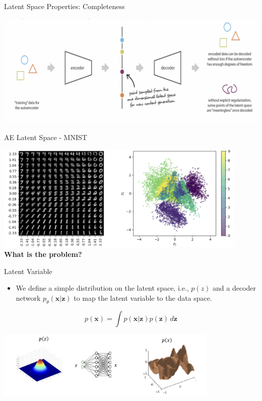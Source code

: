 \documentclass[serif, aspectratio=169]{beamer}
\begin{document}
\begin{frame}{Latent Space Properties: Completeness}
      \begin{center}
        \includegraphics[width=\textwidth]{pic/Latent space property-Completeness.png} 
    \end{center}
\end{frame}

\begin{frame}{AE Latent Space - MNIST}
    \begin{center}
        \includegraphics[width=0.9\textwidth]{pic/AE Latent space - MNIST.png}
        {\color{deepred}\textbf{\\ What is the problem?}}
    \end{center}
\end{frame}

\begin{frame}{Latent Variable}
    \begin{itemize}
        \item We define a simple distribution on the latent space, i.e., \( p(z) \) and a decoder network \( p_\theta(\mathbf{x} | \mathbf{z}) \) to map the latent variable to the data space.
    \end{itemize}

    \vspace{0.1cm}

    \begin{equation*}
        p(\mathbf{x}) = \int p(\mathbf{x} | \mathbf{z}) p(\mathbf{z}) \, d\mathbf{z}
    \end{equation*}

    \begin{center}
        \includegraphics[width=0.8\textwidth]{pic/latent variable.png}
    \end{center}
\end{frame}
\end{document}
